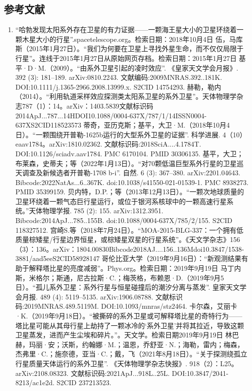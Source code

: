 \subsection{参考文献}
\begin{enumerate}
\item  “哈勃发现太阳系外存在卫星的有力证据——一颗海王星大小的卫星环绕着一颗木星大小的行星”.spacetelescope.org。检索日期：2018年10月4日
 伍，马库斯（2015年1月27日）。“我们为何要在卫星上寻找外星生命，而不仅仅局限于行星”。连线于2015年1月27日从原始网页存档。检索日期：2015年1月27日
 基平·D·M.（2009）。“由系外卫星引起的凌时效应”. 《皇家天文学会月报》. 392 (3): 181–189. arXiv:0810.2243. 文献编码:2009MNRAS.392..181K. DOI:10.1111/j.1365-2966.2008.13999.x. S2CID 14754293.
 赫勒，勒内（2014）。“利用轨道采样效应探测类太阳系卫星的系外卫星”。天体物理学杂志787（1）：14。arXiv：1403.5839文献标识码2014ApJ...787...14HDOI10.1088/0004-637X/787/1/14ISSN0004-637XS2CID118523573
 蒂奇，亚历克斯；基平，大卫·M.（2018年10月4日）。“一颗围绕开普勒-1625b运行的大型系外卫星的证据”. 科学进展. 4（10）eaav1784。arXiv:1810.02362. 文献标识码:2018SciA....4.1784T. DOI:10.1126/sciadv.aav1784. PMC 6170104. PMID 30306135.
 基平，大卫；布莱森，史蒂夫；等（2022年1月13日）。“对70颗低温巨型系外行星的卫星巡天调查及新候选者开普勒-1708 b-i”. 自然. 6 (3): 367–380. arXiv:2201.04643. Bibcode:2022NatAs...6..367K. doi:10.1038/s41550-021-01539-1. PMC 8938273. PMID 35399159.
 贝内特，D.P.；等（2013年12月13日）。“一颗次地球质量的卫星环绕着一颗气态巨行星运行，或位于银河系核球中的一颗高速行星系统。”天体物理学报. 785 (2): 155. arXiv:1312.3951. Bibcode:2014ApJ...785..155B. doi:10.1088/0004-637X/785/2/155. S2CID 118327512.
 宫崎S.等（2018年7月24日）。“MOA-2015-BLG-337：一个拥有低质量棕矮星/行星边界恒星，或棕矮星双星的行星系统”。《天文学杂志》156（3）：136。arXiv：1804.00830Bibcode2018AJ....156..136Mdoi10.3847/1538-3881/aad5eeS2CID58928147
 哥伦比亚大学（2019年9月16日）：“新观测结果有助于解释塔比星的亮度减弱”。Phys.org。检索日期：2019年9月19日
 马丁内斯，米格尔；斯通，尼古拉斯·C.；梅茨格，布赖恩·D.（2019年9月5日）。“孤儿系外卫星：系外行星与恒星碰撞后的潮汐分离与蒸发”. 皇家天文学会月报. 489 (4): 5119–5135. arXiv:1906.08788. 文献标识码:2019MNRAS.489.5119M. DOI:10.1093/mnras/stz2464.
 卡尔森，艾丽卡·K.（2019年9月18日）。“被撕碎的系外卫星或可解释塔比星的奇特行为——塔比星可能从其母行星上劫持了一颗冰冷的‘系外卫星’并将其拉近，导致这颗卫星蒸发，进而产生尘埃和碎片。”。天文学。检索日期2019年9月19日
 林巴赫，玛丽·安；沃斯，约翰娜·M.；温恩，乔舒亚·N.；海勒，雷内；梅森，杰弗里·C.；施奈德，亚当·C.；戴，飞（2021年8月18日）。“关于探测绕孤立行星质量天体运行的系外卫星”. 《天体物理学杂志快报》. 918（2）：L25。arXiv:2108.08323. 文献标识码:2021ApJ...918L..25L. DOI:10.3847/2041-8213/ac1e2d. S2CID 237213523.

\end{enumerate}
